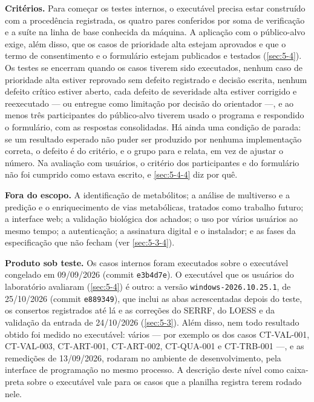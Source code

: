 
\textbf{Critérios.} Para começar os testes internos, o executável precisa estar construído com a procedência registrada, os quatro pares conferidos por soma de verificação e a suíte na linha de base conhecida da máquina. A aplicação com o público-alvo exige, além disso, que os casos de prioridade alta estejam aprovados e que o termo de consentimento e o formulário estejam publicados e testados (\ref{sec:5-4}). Os testes se encerram quando os casos tiverem sido executados, nenhum caso de prioridade alta estiver reprovado sem defeito registrado e decisão escrita, nenhum defeito crítico estiver aberto, cada defeito de severidade alta estiver corrigido e reexecutado --- ou entregue como limitação por decisão do orientador ---, e ao menos três participantes do público-alvo tiverem usado o programa e respondido o formulário, com as respostas consolidadas. Há ainda uma condição de parada: se um resultado esperado não puder ser produzido por nenhuma implementação correta, o defeito é do critério, e o grupo para e relata, em vez de ajustar o número. Na avaliação com usuários, o critério dos participantes e do formulário não foi cumprido como estava escrito, e \ref{sec:5-4-4} diz por quê.


\textbf{Fora do escopo.} A identificação de metabólitos; a análise de multiverso e a predição e o enriquecimento de vias metabólicas, tratados como trabalho futuro; a interface web; a validação biológica dos achados; o uso por vários usuários ao mesmo tempo; a autenticação; a assinatura digital e o instalador; e as fases da especificação que não fecham (ver \ref{sec:5-3-4}).

\textbf{Produto sob teste.} Os casos internos foram executados sobre o executável congelado em 09/09/2026 (commit \texttt{e3b4d7e}). O executável que os usuários do laboratório avaliaram (\ref{sec:5-4}) é outro: a versão \texttt{windows-\allowbreak{}2026.\allowbreak{}10.\allowbreak{}25.\allowbreak{}1}, de 25/10/2026 (commit \texttt{e889349}), que inclui as abas acrescentadas depois do teste, os consertos registrados até lá e as correções do SERRF, do LOESS e da validação da entrada de 24/10/2026 (\ref{sec:5-3}). Além disso, nem todo resultado obtido foi medido no executável: vários --- por exemplo os dos casos CT-VAL-001, CT-VAL-003, CT-ART-001, CT-ART-002, CT-QUA-001 e CT-TRB-001 ---, e as remedições de 13/09/2026, rodaram no ambiente de desenvolvimento, pela interface de programação no mesmo processo. A descrição deste nível como caixa-preta sobre o executável vale para os casos que a planilha registra terem rodado nele.

